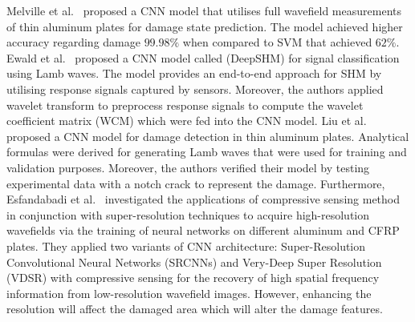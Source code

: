 Melville et al.~\cite{Melville2018} proposed a CNN model that utilises full wavefield measurements of thin aluminum plates for damage state prediction.
The model achieved higher accuracy regarding damage \(99.98\%\) when compared to SVM that achieved \(62\%\).
Ewald et al.~\cite{Ewald2019} proposed a CNN model called (DeepSHM) for signal classification using Lamb waves.
The model provides an end-to-end approach for SHM by utilising response signals captured by sensors.
Moreover, the authors applied wavelet transform to preprocess response signals to compute the wavelet coefficient matrix (WCM) which were fed into the CNN model.
Liu et al.~\cite{Liu2020} proposed a CNN model for damage detection in thin aluminum plates.
Analytical formulas were derived for generating Lamb waves that were used for training and validation purposes.
Moreover, the authors verified their model by testing experimental data with a notch crack to represent the damage.
Furthermore, Esfandabadi et al.~\cite{esfandabadideep} investigated the applications of compressive sensing method in conjunction with super-resolution techniques to acquire high-resolution wavefields via the training of neural networks on different aluminum and CFRP plates. 
They applied two variants of CNN architecture: Super-Resolution Convolutional Neural Networks (SRCNNs) and Very-Deep Super Resolution (VDSR) with compressive sensing for the recovery of high spatial frequency information from low-resolution wavefield images. 
However, enhancing the resolution will affect the damaged area which will alter the damage features.